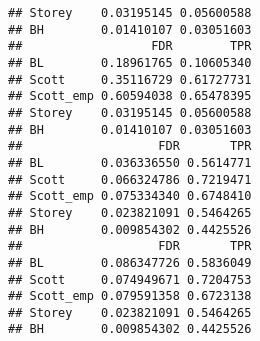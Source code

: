 \documentclass{article}\usepackage[]{graphicx}\usepackage[]{color}
\makeatletter
\newenvironment{kframe}{%
 \def\at@end@of@kframe{}%
 \ifinner\ifhmode%
  \def\at@end@of@kframe{\end{minipage}}%
  \begin{minipage}{\columnwidth}%
 \fi\fi%
 \def\FrameCommand##1{\hskip\@totalleftmargin \hskip-\fboxsep
 \colorbox{shadecolor}{##1}\hskip-\fboxsep
     \hskip-\linewidth \hskip-\@totalleftmargin \hskip\columnwidth}%
 \MakeFramed {\advance\hsize-\width
   \@totalleftmargin\z@ \linewidth\hsize
   \@setminipage}}%
 {\par\unskip\endMakeFramed%
 \at@end@of@kframe}
\newenvironment{knitrout}{}{} %
\makeatother
\begin{document}
\begin{knitrout}
\begin{kframe}
\begin{verbatim}
## Storey    0.03195145 0.05600588
## BH        0.01410107 0.03051603
##                  FDR        TPR
## BL        0.18961765 0.10605340
## Scott     0.35116729 0.61727731
## Scott_emp 0.60594038 0.65478395
## Storey    0.03195145 0.05600588
## BH        0.01410107 0.03051603
##                   FDR       TPR
## BL        0.036336550 0.5614771
## Scott     0.066324786 0.7219471
## Scott_emp 0.075334340 0.6748410
## Storey    0.023821091 0.5464265
## BH        0.009854302 0.4425526
##                   FDR       TPR
## BL        0.086347726 0.5836049
## Scott     0.074949671 0.7204753
## Scott_emp 0.079591358 0.6723138
## Storey    0.023821091 0.5464265
## BH        0.009854302 0.4425526
\end{verbatim}
\end{kframe}
\end{knitrout}
\end{document}
